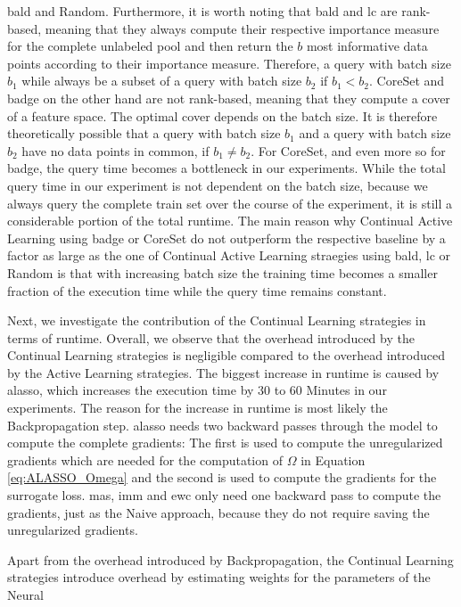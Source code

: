 \gls{bald} and Random. Furthermore, it is worth noting that \gls{bald} and \gls{lc} are rank-based, meaning that they always compute their respective
importance measure for the complete unlabeled pool and then return the $b$ most informative data points according to their importance measure. Therefore,
a query with batch size $b_1$ while always be a subset of a query with batch size $b_2$ if $b_1 < b_2$. CoreSet and \gls{badge} on the other hand are not
rank-based, meaning that they compute a cover of a feature space. The optimal cover depends on the batch size. It is therefore theoretically possible that
a query with batch size $b_1$ and a query with batch size $b_2$ have no data points in common, if $b_1 \neq b_2$. For CoreSet, and even more so for \gls{badge},
the query time becomes a bottleneck in our experiments. While the total query time in our experiment is not dependent on the batch size, because we always query
the complete train set over the course of the experiment, it is still a considerable portion of the total runtime. The main reason why
Continual Active Learning using \gls{badge} or CoreSet do not outperform the respective baseline by a factor as large as the one of Continual Active Learning
straegies using \gls{bald}, \gls{lc} or Random is that with increasing batch size the training time becomes a smaller fraction of the execution time while
the query time remains constant. \par
Next, we investigate the contribution of the Continual Learning strategies in terms of runtime. Overall, we observe that the overhead introduced by the
Continual Learning strategies is negligible compared to the overhead introduced by the Active Learning strategies. The biggest increase in runtime is caused by
\gls{alasso}, which increases the execution time by 30 to 60 Minutes in our experiments. The reason for the increase in runtime is most likely the Backpropagation
step. \gls{alasso} needs two backward passes through the model to compute the complete gradients: The first is used to compute the unregularized gradients which
are needed for the computation of $\Omega$ in Equation \ref{eq:ALASSO_Omega} and the second is used to compute the gradients for the surrogate loss. \gls{mas}, \gls{imm}
and \gls{ewc} only need one backward pass to compute the gradients, just as the Naive approach, because they do not require saving the unregularized gradients. \par
Apart from the overhead introduced by Backpropagation, the Continual Learning strategies introduce overhead by estimating weights for the parameters of the Neural
